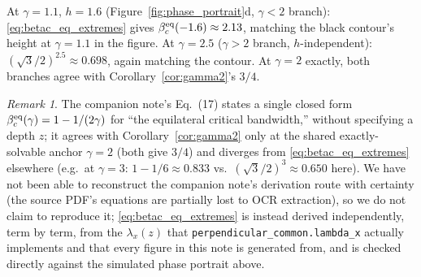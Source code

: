 \documentclass[11pt,a4paper]{article}
\theoremstyle{plain}
\theoremstyle{definition}
\theoremstyle{remark}
\newtheorem{remark}[theorem]{Remark}
\newcommand{\lam}{\lambda}
\newcommand{\bwc}{\beta_c}
\begin{document}
\begin{keybox}
At $\gamma=1.1$, $h=1.6$ (Figure~\ref{fig:phase_portrait}d, $\gamma<2$
branch): \eqref{eq:betac_eq_extremes} gives $\bwc^{\rm eq}(-1.6)\approx2.13$,
matching the black contour's height at $\gamma=1.1$ in the figure. At
$\gamma=2.5$ ($\gamma>2$ branch, $h$-independent):
$(\sqrt3/2)^{2.5}\approx0.698$, again matching the contour. At $\gamma=2$
exactly, both branches agree with Corollary~\ref{cor:gamma2}'s $3/4$.
\end{keybox}

\begin{remark}
The companion note's Eq.~(17) states a single closed form
$\bwc^{\rm eq}(\gamma)=1-1/(2\gamma)$ for ``the equilateral critical
bandwidth,'' without specifying a depth $z$; it agrees with
Corollary~\ref{cor:gamma2} only at the shared exactly-solvable anchor
$\gamma=2$ (both give $3/4$) and diverges from
\eqref{eq:betac_eq_extremes} elsewhere (e.g.\ at $\gamma=3$: $1-1/6\approx0.833$
vs.\ $(\sqrt3/2)^3\approx0.650$ here). We have not been able to
reconstruct the companion note's derivation route with certainty (the
source PDF's equations are partially lost to OCR extraction), so we do not
claim to reproduce it; \eqref{eq:betac_eq_extremes} is instead derived
independently, term by term, from the $\lam_x(z)$ that
\texttt{perpendicular\_common.lambda\_x} actually implements and that
every figure in this note is generated from, and is checked directly
against the simulated phase portrait above.
\end{remark}
\end{document}
